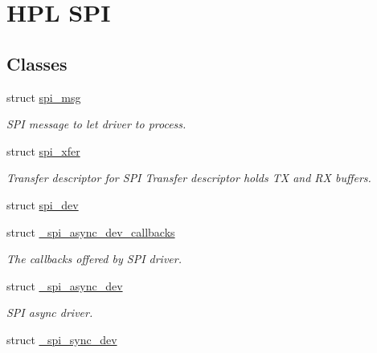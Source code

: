 \hypertarget{group__hpl__spi}{}\section{H\+PL S\+PI}
\label{group__hpl__spi}
\subsection*{Classes}
\begin{DoxyCompactItemize}
\item 
struct \hyperlink{structspi__msg}{spi\+\_\+msg}
\begin{DoxyCompactList}\small\item\em S\+PI message to let driver to process. \end{DoxyCompactList}\item 
struct \hyperlink{structspi__xfer}{spi\+\_\+xfer}
\begin{DoxyCompactList}\small\item\em Transfer descriptor for S\+PI Transfer descriptor holds TX and RX buffers. \end{DoxyCompactList}\item 
struct \hyperlink{structspi__dev}{spi\+\_\+dev}
\item 
struct \hyperlink{struct__spi__async__dev__callbacks}{\+\_\+spi\+\_\+async\+\_\+dev\+\_\+callbacks}
\begin{DoxyCompactList}\small\item\em The callbacks offered by S\+PI driver. \end{DoxyCompactList}\item 
struct \hyperlink{struct__spi__async__dev}{\+\_\+spi\+\_\+async\+\_\+dev}
\begin{DoxyCompactList}\small\item\em S\+PI async driver. \end{DoxyCompactList}\item 
struct \hyperlink{struct__spi__sync__dev}{\+\_\+spi\+\_\+sync\+\_\+dev}
\end{DoxyCompactItemize}

